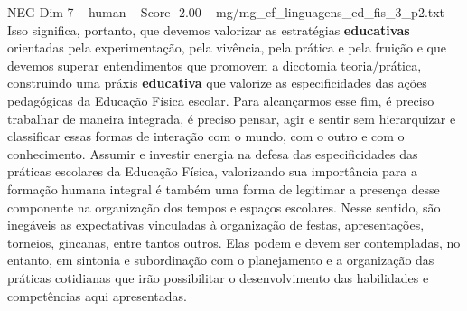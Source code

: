 \begin{textsample}{NEG Dim 7 – human – Score -2.00 – mg/mg\_ef\_linguagens\_ed\_fis\_3\_p2.txt}  \label{ex:f7_neg_020}
Isso significa, portanto, que devemos valorizar as estratégias \textbf{educativas} orientadas pela experimentação, pela vivência, pela prática e pela fruição e que devemos superar entendimentos que promovem a dicotomia teoria/prática, construindo uma práxis \textbf{educativa} que valorize as especificidades das ações pedagógicas da Educação Física escolar.
Para alcançarmos esse fim, é preciso trabalhar de maneira integrada, é preciso pensar, agir e sentir sem hierarquizar e classificar essas formas de interação com o mundo, com o outro e com o conhecimento.
Assumir e investir energia na defesa das especificidades das práticas escolares da Educação Física, valorizando sua importância para a formação humana integral é também uma forma de legitimar a presença desse componente na organização dos tempos e espaços escolares.
Nesse sentido, são inegáveis as expectativas vinculadas à organização de festas, apresentações, torneios, gincanas, entre tantos outros.
Elas podem e devem ser contempladas, no entanto, em sintonia e subordinação com o planejamento e a organização das práticas cotidianas que irão possibilitar o desenvolvimento das habilidades e competências aqui apresentadas.

\end{textsample}
